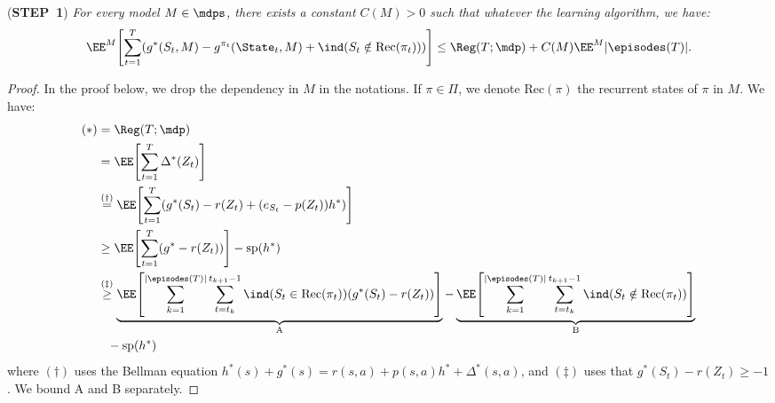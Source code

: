 \documentclass[preprint,cleveref,12pt]{colt2025}
\DeclarePairedDelimiter{\brackets}{[}{]}	%
\DeclarePairedDelimiter{\parens}{(}{)}	%
\DeclarePairedDelimiter{\abs}{\lvert}{\rvert}	%
\newcommand{\indic}[1]{\ind\parens{#1}}
\def\indicator{\indic}
\newcommand{\eqindicator}[1]{\ind\parens*{#1}}
\newcommand{\vecspan}[1]{\mathrm{sp}\parens{#1}}
\def\model{\mdp}
\def\models{\mdps}
\def\STEP#1{(\strong{STEP~#1})}
\newcommand{\strong}[1]{\textbf{#1}}
\begin{document}
    \bigskip
    \noindent
    \STEP{1}
    \textit{
        For every model $M \in \models$, there exists a constant $C(M) > 0$ such that whatever the learning algorithm, we have:
        \begin{equation}
        \label{equation_well_definition_1A}
            \EE^M\brackets*{
                \sum_{t=1}^T \parens*{
                    g^*(S_t, M) - g^{\pi_t}(\State_t, M)
                    + \indicator{S_t \notin \mathrm{Rec}(\pi_t)}
                }
            }
            \le
            \Reg(T; \model)
            + C(M) \EE^M \abs*{\episodes(T)}
            .
        \end{equation}
    }
    \begin{proof}
        In the proof below, we drop the dependency in $M$ in the notations. 
        If $\pi \in \Pi$, we denote $\mathrm{Rec}(\pi)$ the recurrent states of $\pi$ in $M$.
        We have:
        \begin{align*}
            (*) 
            & = \Reg(T; \model)
            \\
            & = 
            \EE\brackets*{
                \sum_{t=1}^T \Delta^*(Z_t)
            }
            \\
            & \overset{(\dagger)}= 
            \EE \brackets*{
                \sum_{t=1}^T 
                \parens*{g^*(S_t) - r(Z_t) + \parens*{e_{S_t} - p(Z_t)} h^*}
            }
            \\
            & \ge
            \EE \brackets*{
                \sum_{t=1}^T (g^* - r(Z_t))
            }
            - \vecspan{h^*}
            \\
            & \overset{(\ddagger)}\ge 
            \underbrace{
                \EE \brackets*{
                    \sum_{k=1}^{\abs*{\episodes(T)}} \sum_{t=t_k}^{t_{k+1}-1}
                    \eqindicator{S_t \in \mathrm{Rec}(\pi_t)}
                    (g^*(S_t) - r(Z_t))
                }
            }_{\mathrm{A}}
            - \underbrace{
                \EE \brackets*{
                    \sum_{k=1}^{\abs*{\episodes(T)}} \sum_{t=t_k}^{t_{k+1}-1}
                    \eqindicator{S_t \notin \mathrm{Rec}(\pi_t)}
                }
            }_{\mathrm{B}}
            \\
            & \phantom{=} - \vecspan{h^*}
        \end{align*}
        where $(\dagger)$ uses the Bellman equation $h^*(s) + g^*(s) = r(s,a) + p(s,a)h^* + \Delta^*(s,a)$, and $(\ddagger)$ uses that $g^*(S_t) - r(Z_t) \ge -1$. 
        We bound A and B separately. 

\end{proof}
\end{document}
